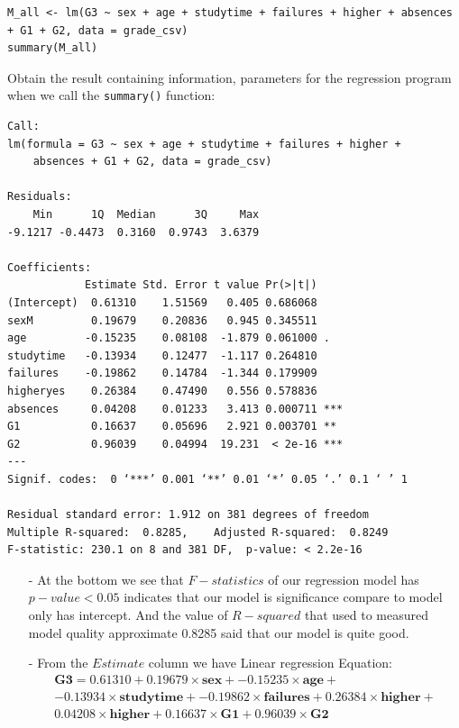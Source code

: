 \documentclass[a4paper]{article}
\numberwithin{equation}{section}
\begin{document}
\begin{mdframed}[leftline=false,rightline=false,backgroundcolor=magenta!10,nobreak=true]
  \begin{verbatim}
M_all <- lm(G3 ~ sex + age + studytime + failures + higher + absences + G1 + G2, data = grade_csv)
summary(M_all)
  \end{verbatim}
\end{mdframed}

Obtain the result containing information, parameters for the regression program when we call the \texttt{summary()} function:
\begin{mdframed}[leftline=false,rightline=false,backgroundcolor=teal!10,nobreak=true]
  \begin{verbatim}
Call:
lm(formula = G3 ~ sex + age + studytime + failures + higher +
    absences + G1 + G2, data = grade_csv)

Residuals:
    Min      1Q  Median      3Q     Max
-9.1217 -0.4473  0.3160  0.9743  3.6379

Coefficients:
            Estimate Std. Error t value Pr(>|t|)
(Intercept)  0.61310    1.51569   0.405 0.686068
sexM         0.19679    0.20836   0.945 0.345511
age         -0.15235    0.08108  -1.879 0.061000 .
studytime   -0.13934    0.12477  -1.117 0.264810
failures    -0.19862    0.14784  -1.344 0.179909
higheryes    0.26384    0.47490   0.556 0.578836
absences     0.04208    0.01233   3.413 0.000711 ***
G1           0.16637    0.05696   2.921 0.003701 **
G2           0.96039    0.04994  19.231  < 2e-16 ***
---
Signif. codes:  0 ‘***’ 0.001 ‘**’ 0.01 ‘*’ 0.05 ‘.’ 0.1 ‘ ’ 1

Residual standard error: 1.912 on 381 degrees of freedom
Multiple R-squared:  0.8285,	Adjusted R-squared:  0.8249
F-statistic: 230.1 on 8 and 381 DF,  p-value: < 2.2e-16
  \end{verbatim}
\end{mdframed}

\begin{itemize}
  \item [-] At the bottom we see that \(F-statistics\) of our regression model has \(p-value < 0.05\) indicates that our model is significance compare to model only has intercept. And the value of \(R-squared\) that used to measured model quality approximate 0.8285 said that our model is quite good.

  \item[-] From the \(Estimate\) column we have Linear regression Equation:
        \begin{multline*}
          \textbf{G3} =  0.61310 + 0.19679\times \textbf{sex} + -0.15235\times \textbf{age} + \\
          -0.13934\times \textbf{studytime} + -0.19862\times \textbf{failures} + 0.26384\times \textbf{higher} + \\ 0.04208\times \textbf{higher} + 0.16637\times \textbf{G1} + 0.96039\times \textbf{G2}
        \end{multline*}
\end{itemize}
\end{document}
